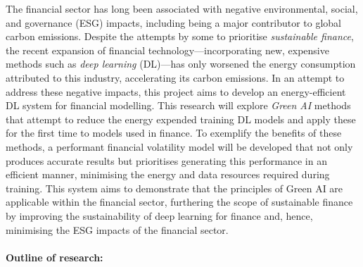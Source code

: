 \documentclass[a4paper, 11pt]{report}
\begin{document}
    The financial sector has long been associated with negative environmental, social, and governance (ESG) impacts, including being a major contributor to global carbon emissions. Despite the attempts by some to prioritise \emph{sustainable finance}, the recent expansion of financial technology---incorporating new, expensive methods such as \emph{deep learning} (DL)---has only worsened the energy consumption attributed to this industry, accelerating its carbon emissions. In an attempt to address these negative impacts, this project aims to develop an energy-efficient DL system for financial modelling. This research will explore \emph{Green AI} methods that attempt to reduce the energy expended training DL models and apply these for the first time to models used in finance. To exemplify the benefits of these methods, a performant financial volatility model will be developed that not only produces accurate results but prioritises generating this performance in an efficient manner, minimising the energy and data resources required during training. This system aims to demonstrate that the principles of Green AI are applicable within the financial sector, furthering the scope of sustainable finance by improving the sustainability of deep learning for finance and, hence, minimising the ESG impacts of the financial sector.
    \\
    \textbf{\\Outline of research:} 
\end{document}
